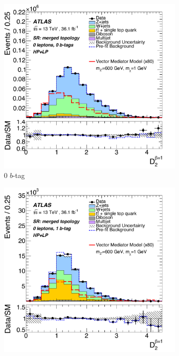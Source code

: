 \begin{figure}[htbp]
\centering
  \begin{subfigure}{0.45\textwidth}
    \centering
    \includegraphics[width=1.\textwidth]{figures/monoV/results/figaux_06a.pdf}
    \caption{0 \(b\)-tag}
  \end{subfigure}
    \begin{subfigure}{0.45\textwidth}
    \centering
    \includegraphics[width=1.\textwidth]{figures/monoV/results/figaux_06b.pdf}

\end{subfigure}
\end{figure}
